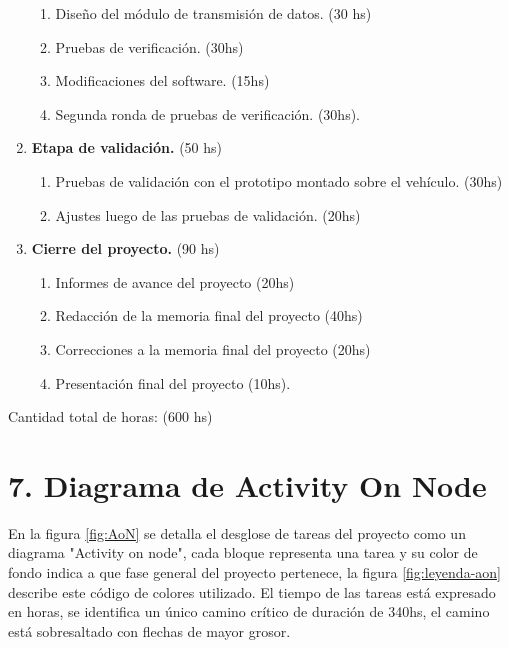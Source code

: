 \documentclass[11pt]{charter}
\begin{document}
\begin{enumerate}
\begin{enumerate}
	\item Diseño del módulo de transmisión de datos. (30 hs)
	\item Pruebas de verificación. (30hs)
	\item Modificaciones del software. (15hs)
	\item Segunda ronda de pruebas de verificación. (30hs).
	\end{enumerate}
\item \textbf{Etapa de validación.} (50 hs)
	\begin{enumerate}
	\item Pruebas de validación con el prototipo montado sobre el vehículo. (30hs)
	\item Ajustes luego de las pruebas de validación. (20hs)
	\end{enumerate}
\item \textbf{Cierre del proyecto.} (90 hs)
	\begin{enumerate}
	\item Informes de avance del proyecto (20hs)
	\item Redacción de la memoria final del proyecto (40hs)
	\item Correcciones a la memoria final del proyecto (20hs)
	\item Presentación final del proyecto (10hs).
	\end{enumerate}
\end{enumerate}

Cantidad total de horas: (600 hs)


\section{7. Diagrama de Activity On Node}
\label{sec:AoN}

En la figura \ref{fig:AoN} se detalla el desglose de tareas del proyecto como un diagrama "Activity on node", cada bloque representa una tarea y su color de fondo indica a que fase general del proyecto pertenece, la figura \ref{fig:leyenda-aon} describe este código de colores utilizado. El tiempo de las tareas está expresado en horas, se identifica un único camino crítico de duración de 340hs, el camino está sobresaltado con flechas de mayor grosor.
\end{document}
